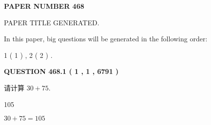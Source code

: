 \documentclass{ctexart}
\begin{document}
   
   
   
\newpage 
\setcounter{page}{ 
   468001 } 
   
   
   
   
 {\textbf{ \Large{ PAPER NUMBER  468  }}}
   
   
\vspace{0.2in}
   
   
   
   
   
   
   
   
 \vspace{0.2in}
 
 
 
 
   
   
 PAPER TITLE GENERATED.
   
   
   
\vspace{0.2in}
   
In this paper, big questions will be generated in the following order: 
   
   
   1 ( 1 )
 ,
   2 ( 2 )
 .
  
\vspace{0.2in}
  
{\textbf{\Large{QUESTION
468.1 
 ( 1 , 1 , 6791 )
}}}
  
  
 
请计算 $ %
30 +  %
75 $.
 
 
 
\noindent{}
 
 

105
 
 
\noindent{}
 
 

 
 
 
\noindent{}
 
 

$ %
30 +  %
75=   %
105$
 
 
\noindent{}
 
 

 
   
   
   
\end{document}
